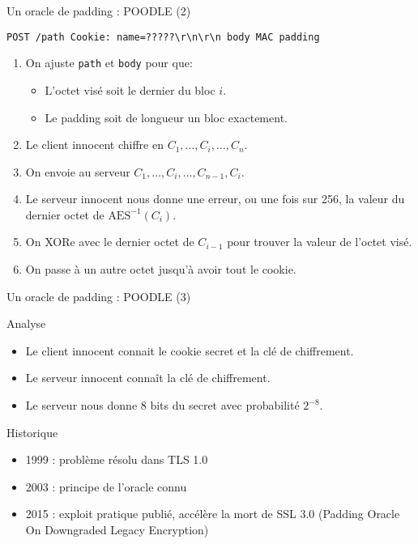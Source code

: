 \documentclass{mpg-ep-slides}
\begin{document}
\begin{frame}[containsverbatim]{Un oracle de padding : POODLE (2)}
  \begin{Verbatim}[gobble=4]
    POST /path Cookie: name=?????\r\n\r\n body MAC padding
  \end{Verbatim}
  \begin{enumerate}
    \item On ajuste \texttt{path} et \texttt{body} pour que:
      \begin{itemize}
        \item L'octet visé soit le dernier du bloc $i$.
        \item Le padding soit de longueur un bloc exactement.
      \end{itemize}
    \item Le client innocent chiffre en $C_1, \dots, C_i, \dots, C_n$.
    \item On envoie au serveur $C_1, \dots, C_i, \dots, C_{n-1}, C_i$.
    \item Le serveur innocent nous donne une erreur, ou une fois sur 256, la
      valeur du dernier octet de $\text{AES}^{-1}(C_i)$.
    \item On XORe avec le dernier octet de $C_{i-1}$ pour trouver la valeur de
      l'octet visé.
    \item On passe à un autre octet jusqu'à avoir tout le cookie.
  \end{enumerate}
\end{frame}

\begin{frame}{Un oracle de padding : POODLE (3)}
  \begin{block}{Analyse}
    \begin{itemize}
      \item Le client innocent connait le cookie secret et la clé de
        chiffrement.
      \item Le serveur innocent connaît la clé de chiffrement.
      \item Le serveur nous donne 8 bits du secret avec probabilité $2^{-8}$.
    \end{itemize}
  \end{block}

  \begin{block}{Historique}
    \begin{itemize}
      \item 1999 : problème résolu dans TLS 1.0
      \item 2003 : principe de l'oracle connu
      \item 2015 : exploit pratique publié, accélère la mort de SSL 3.0
        (Padding Oracle On Downgraded Legacy Encryption)
    \end{itemize}
  \end{block}
\end{frame}
\end{document}
